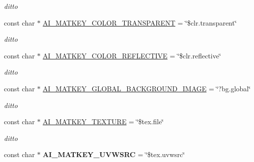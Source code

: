 \begin{DoxyCompactItemize}
\begin{DoxyCompactList}\small\item\em ditto \end{DoxyCompactList}\item 
\hypertarget{namespaceassimp_1_1material_a4d4d2dd2da933d250e0410ddffb5eb4a}{const char $\ast$ \hyperlink{namespaceassimp_1_1material_a4d4d2dd2da933d250e0410ddffb5eb4a}{A\+I\+\_\+\+M\+A\+T\+K\+E\+Y\+\_\+\+C\+O\+L\+O\+R\+\_\+\+T\+R\+A\+N\+S\+P\+A\+R\+E\+N\+T} = \char`\"{}\$clr.\+transparent\char`\"{}}\label{namespaceassimp_1_1material_a4d4d2dd2da933d250e0410ddffb5eb4a}

\begin{DoxyCompactList}\small\item\em ditto \end{DoxyCompactList}\item 
\hypertarget{namespaceassimp_1_1material_aceb845ca1b31120218e1da88af53a418}{const char $\ast$ \hyperlink{namespaceassimp_1_1material_aceb845ca1b31120218e1da88af53a418}{A\+I\+\_\+\+M\+A\+T\+K\+E\+Y\+\_\+\+C\+O\+L\+O\+R\+\_\+\+R\+E\+F\+L\+E\+C\+T\+I\+V\+E} = \char`\"{}\$clr.\+reflective\char`\"{}}\label{namespaceassimp_1_1material_aceb845ca1b31120218e1da88af53a418}

\begin{DoxyCompactList}\small\item\em ditto \end{DoxyCompactList}\item 
\hypertarget{namespaceassimp_1_1material_a55d2f805a84b89879fd0afc8a17bf0cb}{const char $\ast$ \hyperlink{namespaceassimp_1_1material_a55d2f805a84b89879fd0afc8a17bf0cb}{A\+I\+\_\+\+M\+A\+T\+K\+E\+Y\+\_\+\+G\+L\+O\+B\+A\+L\+\_\+\+B\+A\+C\+K\+G\+R\+O\+U\+N\+D\+\_\+\+I\+M\+A\+G\+E} = \char`\"{}?bg.\+global\char`\"{}}\label{namespaceassimp_1_1material_a55d2f805a84b89879fd0afc8a17bf0cb}

\begin{DoxyCompactList}\small\item\em ditto \end{DoxyCompactList}\item 
const char $\ast$ \hyperlink{namespaceassimp_1_1material_a267de50d6dfe754f700df9e231ea6b60}{A\+I\+\_\+\+M\+A\+T\+K\+E\+Y\+\_\+\+T\+E\+X\+T\+U\+R\+E} = \char`\"{}\$tex.\+file\char`\"{}
\begin{DoxyCompactList}\small\item\em ditto \end{DoxyCompactList}\item 
\hypertarget{namespaceassimp_1_1material_a53bd0cd4e85babdd5acf22d248673bd6}{const char $\ast$ {\bfseries A\+I\+\_\+\+M\+A\+T\+K\+E\+Y\+\_\+\+U\+V\+W\+S\+R\+C} = \char`\"{}\$tex.\+uvwsrc\char`\"{}}\label{namespaceassimp_1_1material_a53bd0cd4e85babdd5acf22d248673bd6}


\end{DoxyCompactItemize}
